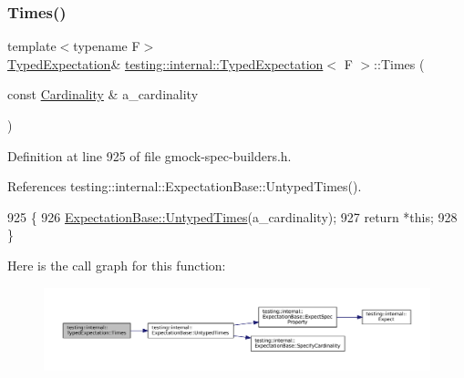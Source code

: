 \subsubsection{\texorpdfstring{Times()}{Times()}\hspace{0.1cm}{\footnotesize\ttfamily [1/2]}}
{\footnotesize\ttfamily template$<$typename F$>$ \\
\hyperlink{classtesting_1_1internal_1_1TypedExpectation}{Typed\+Expectation}\& \hyperlink{classtesting_1_1internal_1_1TypedExpectation}{testing\+::internal\+::\+Typed\+Expectation}$<$ F $>$\+::Times (\begin{DoxyParamCaption}\item[{const \hyperlink{classtesting_1_1Cardinality}{Cardinality} \&}]{a\+\_\+cardinality }\end{DoxyParamCaption})\hspace{0.3cm}{\ttfamily [inline]}}



Definition at line 925 of file gmock-\/spec-\/builders.\+h.



References testing\+::internal\+::\+Expectation\+Base\+::\+Untyped\+Times().


\begin{DoxyCode}
925                                                             \{
926     \hyperlink{classtesting_1_1internal_1_1ExpectationBase_a05bbd7fea6ea3c740ea095ea7462bc07}{ExpectationBase::UntypedTimes}(a\_cardinality);
927     \textcolor{keywordflow}{return} *\textcolor{keyword}{this};
928   \}
\end{DoxyCode}
Here is the call graph for this function\+:
\nopagebreak
\begin{figure}[H]
\begin{center}
\leavevmode
\includegraphics[width=350pt]{classtesting_1_1internal_1_1TypedExpectation_a9a4c34ee5c6e6adc880a22f61f33da57_cgraph}
\end{center}
\end{figure}
\mbox{\label{classtesting_1_1internal_1_1TypedExpectation_a92d56ee785d38ec8193aed2a0fcbccf0}} 
